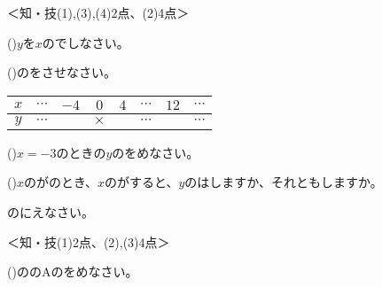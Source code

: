 \documentclass[
  12pt,a4paper,lualatex,ja=standard]{bxjsarticle}
\begin{document}
\begin{flushleft}
%
\begin{flushright}%
\footnotesize{＜知・技(1),(3),(4)2点、(2)4点＞}%
\end{flushright}%


()\hspace{2.5pt}$y$を$x$のでしなさい。

()\hspace{2.5pt}のをさせなさい。

\begin{center}
\begin{tabular}{c|ccccccc}
\hline
$x$ & $\cdots$ & $-4$ & $0$ & $4$ & $\cdots$ & $12$ & $\cdots$ \\
\hline
$y$ & $\cdots$ &  & $\times$ &  & $\cdots$ & & $\cdots$ \\
\hline
\end{tabular}
\end{center}

()\hspace{2.5pt}$x = -3$のときの$y$のをめなさい。

()\hspace{2.5pt}$x$のがのとき、$x$のがすると、$y$のはしますか、それともしますか。

\vfill

\newpage

\setcounter{skaunta}{0}
\begin{multicols}{2}
\noindent{} \hspace{1pt}のにえなさい。

%
\begin{flushright}%
\footnotesize{＜知・技(1)2点、(2),(3)4点＞}%
\end{flushright}%


()\hspace{2.5pt}ののAのをめなさい。


\end{multicols}
\end{flushleft}
\end{document}
